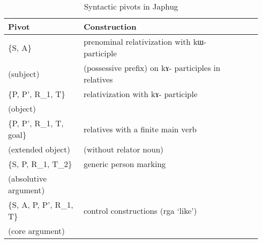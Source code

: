 \documentclass[oldfontcommands,oneside,a4paper,11pt]{article}
\newcommand{\ipa}[1]{{\phon #1}} %
\begin{document}
\begin{table}[H]
\caption{Syntactic pivots in Japhug} \label{tab:japhug.pivot} \centering
\begin{tabular}{llllll}
\toprule
Pivot & Construction \\
\midrule
\{S, A\}  & prenominal relativization with \ipa{kɯ-} participle  \\
 (subject)&(possessive prefix) on \ipa{kɤ-} participles in relatives \\
 \midrule
\{P, P', R_1, T\}  &relativization with \ipa{kɤ-} participle \\
(object)  & \\
\midrule
\{P, P', R_1, T, goal\} &
relatives with a finite main verb \\
(extended object) &(without relator noun)\\
\midrule
 \{S, P, R_1, T_2\} & generic person marking\\
 (absolutive argument)\\
 \midrule
  \{S, A, P, P', R_1, T\} & control constructions (\ipa{rga}  `like') \\
 (core argument)\\
\bottomrule
\end{tabular}
\end{table}





\end{document}
